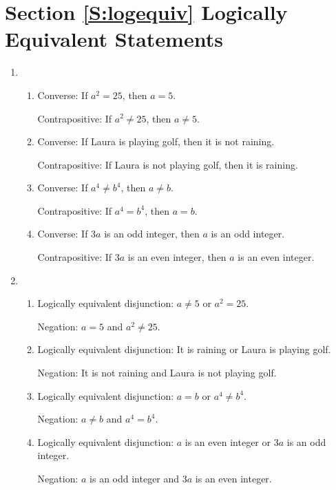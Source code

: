 \section*{Section \ref{S:logequiv} Logically Equivalent Statements}

\begin{enumerate}
\item \begin{enumerate}
\item Converse:  If $a^2 = 25$, then $a = 5$.

Contrapositive:  If $a^2 \ne 25$, then $a \ne 5$.
\item Converse:  If Laura is playing golf, then it is not raining.

Contrapositive:  If Laura is not playing golf, then it is raining.
\item Converse:  If $a^4 \ne b^4$, then $a \ne b$.

Contrapositive:  If $a^4 = b^4$, then $a = b$.
\item Converse:  If $3a$ is an odd integer, then $a$ is an odd integer.

Contrapositive:  If $3a$ is an even integer, then $a$ is an even integer.
\end{enumerate}

\item \begin{enumerate}
\item Logically equivalent disjunction:  $a \ne 5$ or $a^2 = 25$.

Negation:  $a = 5$ and $a^2 \ne 25$.
\item Logically equivalent disjunction:  It is raining or Laura is playing golf.

Negation:  It is not raining and Laura is not playing golf.
\item Logically equivalent disjunction:  $a = b$ or $a^4 \ne b^4$.

Negation:  $a \ne b$ and $a^4 = b^4$.
\item Logically equivalent disjunction:  $a$ is an even integer or $3a$ is an odd integer.

Negation:  $a$ is an odd integer and $3a$ is an even integer.
\end{enumerate}


\end{enumerate}
